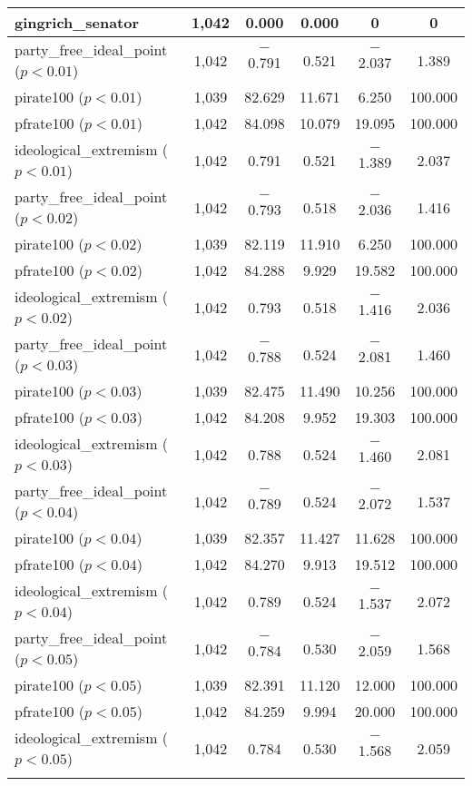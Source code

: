 \documentclass[12pt]{article}
\begin{document}
\begin{table}[ht]
\begin{tabular}{@{\extracolsep{5pt}}lccccc}
		gingrich\_senator & 1,042 & 0.000 & 0.000 & 0 & 0 \\ 
		\hline
		party\_free\_ideal\_point ($ p < 0.01 $) & 1,042 & $-$0.791 & 0.521 & $-$2.037 & 1.389 \\ 
		pirate100 ($ p < 0.01 $) & 1,039 & 82.629 & 11.671 & 6.250 & 100.000 \\ 
		pfrate100 ($ p < 0.01 $) & 1,042 & 84.098 & 10.079 & 19.095 & 100.000 \\ 
		ideological\_extremism ($ p < 0.01 $) & 1,042 & 0.791 & 0.521 & $-$1.389 & 2.037 \\ 
		\hline
		party\_free\_ideal\_point ($ p < 0.02 $) & 1,042 & $-$0.793 & 0.518 & $-$2.036 & 1.416 \\ 
		pirate100 ($ p < 0.02 $) & 1,039 & 82.119 & 11.910 & 6.250 & 100.000 \\ 
		pfrate100 ($ p < 0.02 $) & 1,042 & 84.288 & 9.929 & 19.582 & 100.000 \\ 
		ideological\_extremism ($ p < 0.02 $) & 1,042 & 0.793 & 0.518 & $-$1.416 & 2.036 \\ 
		\hline
		party\_free\_ideal\_point ($ p < 0.03 $) & 1,042 & $-$0.788 & 0.524 & $-$2.081 & 1.460 \\ 
		pirate100 ($ p < 0.03 $) & 1,039 & 82.475 & 11.490 & 10.256 & 100.000 \\ 
		pfrate100 ($ p < 0.03 $) & 1,042 & 84.208 & 9.952 & 19.303 & 100.000 \\ 
		ideological\_extremism ($ p < 0.03 $) & 1,042 & 0.788 & 0.524 & $-$1.460 & 2.081 \\ 
		\hline
		party\_free\_ideal\_point ($ p < 0.04 $) & 1,042 & $-$0.789 & 0.524 & $-$2.072 & 1.537 \\ 
		pirate100 ($ p < 0.04 $) & 1,039 & 82.357 & 11.427 & 11.628 & 100.000 \\ 
		pfrate100 ($ p < 0.04 $) & 1,042 & 84.270 & 9.913 & 19.512 & 100.000 \\ 
		ideological\_extremism ($ p < 0.04 $) & 1,042 & 0.789 & 0.524 & $-$1.537 & 2.072 \\ 
		\hline
		party\_free\_ideal\_point ($ p < 0.05 $) & 1,042 & $-$0.784 & 0.530 & $-$2.059 & 1.568 \\ 
		pirate100 ($ p < 0.05 $) & 1,039 & 82.391 & 11.120 & 12.000 & 100.000 \\ 
		pfrate100 ($ p < 0.05 $) & 1,042 & 84.259 & 9.994 & 20.000 & 100.000 \\ 
		ideological\_extremism ($ p < 0.05 $) & 1,042 & 0.784 & 0.530 & $-$1.568 & 2.059 \\ 
		\hline \\[-1.8ex] 
	\end{tabular} 
\end{table} 
\end{document}
